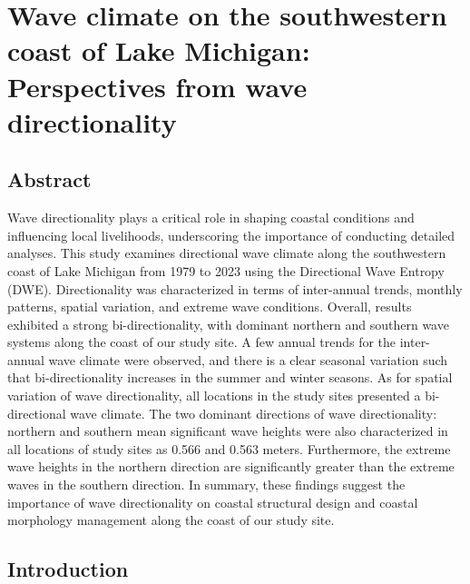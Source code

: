 \chapter{Wave climate on the southwestern coast of Lake Michigan: Perspectives from wave directionality}
\label{chapter3}

\section{Abstract}
\label{c3_Abstract}
Wave directionality plays a critical role in shaping coastal conditions and
influencing local livelihoods, underscoring the importance of conducting
detailed analyses. This study examines directional wave climate along the
southwestern coast of Lake Michigan from 1979 to 2023 using the Directional Wave
Entropy (DWE). Directionality was characterized in terms of inter-annual trends,
monthly patterns, spatial variation, and extreme wave conditions. Overall,
results exhibited a strong bi-directionality, with dominant northern and
southern wave systems along the coast of our study site. A few annual trends for
the inter-annual wave climate were observed, and there is a clear seasonal
variation such that bi-directionality increases in the summer and winter
seasons. As for spatial variation of wave directionality, all locations in the
study sites presented a bi-directional wave climate. The two dominant directions
of wave directionality: northern and southern mean significant wave heights were
also characterized in all locations of study sites as 0.566 and 0.563 meters.
Furthermore, the extreme wave heights in the northern direction are
significantly greater than the extreme waves in the southern direction. In
summary, these findings suggest the importance of wave directionality on coastal
structural design and coastal morphology management along the coast of our study
site. 

\section{Introduction}
\label{c3_Introduction}

